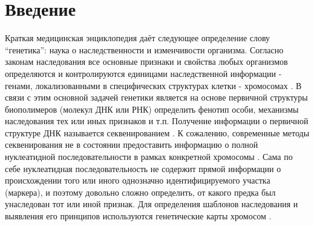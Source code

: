\documentclass{matmex-diploma-custom}
\begin{document}
\maketitle \tableofcontents
\section*{Введение}

Краткая медицинская энциклопедия \cite{petrovsky1989} даёт следующее
определение слову “генетика”: наука о наследственности и изменчивости
организма. Согласно законам наследования все основные признаки и
свойства любых организмов определяются и контролируются единицами
наследственной информации - генами, локализованными в специфических
структурах клетки - хромосомах
\cite{griffiths2005introduction,griffiths2000introduction}. В связи с
этим основной задачей генетики является на основе первичной структуры
биополимеров (молекул ДНК или РНК) определить фенотип особи, механизмы
наследования тех или иных признаков и т.п. Получение информации о
первичной структуре ДНК называется секвенированием \cite{cito1994}. К
сожалению, современные методы секвенирования не в состоянии
предоставить информацию о полной нуклеатидной последовательности в
рамках конкретной хромосомы \cite{molecular}. Сама по себе
нуклеатидная последовательность не содержит прямой информации о
происхождении того или иного однозначно идентифицируемого участка
(маркера), и поэтому довольно сложно определить, от какого предка был
унаследован тот или иной признак. Для определения шаблонов
наследования и выявления его принципов используются генетические карты
хромосом \cite{morgan1922mechanism}.
\end{document}
